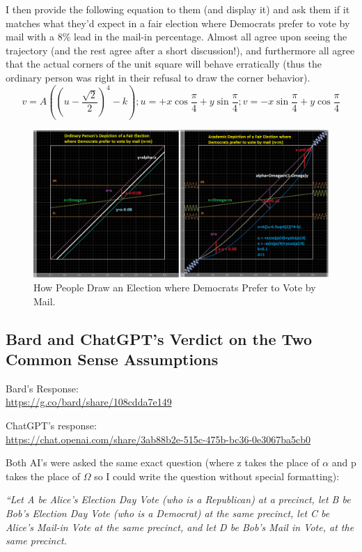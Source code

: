 \documentclass[preprint,13pt]{elsarticle}
\begin{document}
I then provide the following equation to them (and display it) and ask them if it matches what they'd expect in a fair election where Democrats prefer to vote by mail with a 8\% lead in the mail-in percentage. Almost all agree upon seeing the trajectory (and the rest agree after a short discussion!), and furthermore all agree that the actual corners of the unit square will behave erratically (thus the ordinary person was right in their refusal to draw the corner behavior).
$$v=A\left(\left(u-\frac{\sqrt{2}}{2}\right)^4-k\right); u=+x\cos{\frac{\pi}{4}}+y\sin{\frac{\pi}{4}}; v=-x\sin{\frac{\pi}{4}}+y\cos{\frac{\pi}{4}}$$
\begin{figure}[bp!]
\begin{center}
\caption{How People Draw an Election where Democrats Prefer to Vote by Mail.}
\includegraphics[width=350pt]{Fifth Grader vs Grad.png}
\end{center}
\end{figure}
\newpage
\subsection{Bard and ChatGPT's Verdict on the Two Common Sense Assumptions}
Bard's Response:\\
\url{https://g.co/bard/share/108cdda7e149}

ChatGPT's response:\\
\url{https://chat.openai.com/share/3ab88b2e-515c-475b-bc36-0e3067ba5cb0}

Both AI's were asked the same exact question (where z takes the place of $\alpha$ and p takes the place of $\Omega$ so I could write the question without special formatting):

\textit{``Let A be Alice's Election Day Vote (who is a Republican) at a precinct, let B be Bob's Election Day Vote (who is a Democrat) at the same precinct, let C be Alice's Mail-in Vote at the same precinct, and let D be Bob's Mail in Vote, at the same precinct.}
\end{document}
